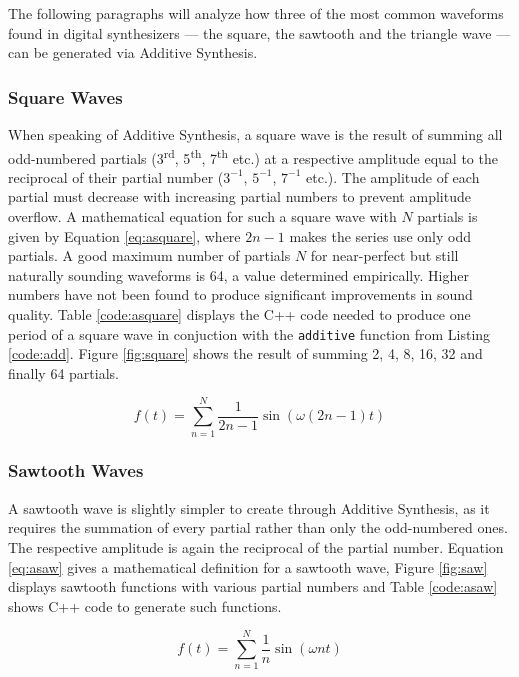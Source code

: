 The following paragraphs will analyze how three of the most common waveforms found in digital synthesizers --- the square, the sawtooth and the triangle wave --- can be generated via Additive Synthesis.

\subsubsection{Square Waves}

When speaking of Additive Synthesis, a square wave is the result of summing all odd-numbered partials (3\textsuperscript{rd}, 5\textsuperscript{th}, 7\textsuperscript{th} etc.) at a respective amplitude equal to the reciprocal of their partial number ($3^{-1}$, $5^{-1}$, $7^{-1}$ etc.). The amplitude of each partial must decrease with increasing partial numbers to prevent amplitude overflow. A mathematical equation for such a square wave with $N$ partials is given by Equation \ref{eq:asquare}, where $2n - 1$ makes the series use only odd partials. A good maximum number of partials $N$ for near-perfect but still naturally sounding waveforms is 64, a value determined empirically. Higher numbers have not been found to produce significant improvements in sound quality. Table \ref{code:asquare} displays the C++ code needed to produce one period of a square wave in conjuction with the \texttt{additive} function from Listing \ref{code:add}. Figure \ref{fig:square} shows the result of summing 2, 4, 8, 16, 32 and finally 64 partials.

\begin{equation}
  f(t) = \sum\limits_{n=1}^N \frac{1}{2n -1} \sin(\omega (2n - 1) t)
  \label{eq:asquare}
\end{equation}

\subsubsection{Sawtooth Waves}

A sawtooth wave is slightly simpler to create through Additive Synthesis, as it requires the summation of every partial rather than only the odd-numbered ones. The respective amplitude is again the reciprocal of the partial number. Equation \ref{eq:asaw} gives a mathematical definition for a sawtooth wave, Figure \ref{fig:saw} displays sawtooth functions with various partial numbers and Table \ref{code:asaw} shows C++ code to generate such functions.

\begin{equation}
  f(t) = \sum\limits_{n=1}^N \frac{1}{n} \sin(\omega n t)
  \label{eq:asaw}
\end{equation}

